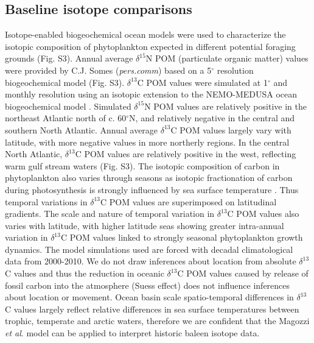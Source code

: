 \documentclass[a4paper,12pt]{article}
\begin{document}
\subsection{Baseline isotope
comparisons}\label{baseline-isotope-comparisons}

Isotope-enabled biogeochemical ocean models \cite{magozzi2017using,schmittner2016complementary} were used to characterize
the isotopic composition of phytoplankton expected in different
potential foraging grounds (Fig. S3). 
Annual average \(\delta^{15}\)N POM (particulate organic matter) values were provided by C.J. Somes (\textit{pers.comm}) based on a 5\({}^{\circ}\) resolution biogeochemical model (Fig. S3). \(\delta^{13}\)C POM values were simulated at 1\({}^{\circ}\) and monthly resolution using an isotopic extension to the NEMO-MEDUSA ocean biogeochemical model \cite{magozzi2017using,yool2013medusa}. 
Simulated \(\delta^{15}\)N POM values are relatively positive in the northeast Atlantic north of c. 60\({}^{\circ}\)N, and relatively negative in the central and southern North Atlantic. 
Annual average \(\delta^{13}\)C POM values largely vary with latitude, with more negative values in more northerly regions. 
In the central North Atlantic, \(\delta^{13}\)C POM values are relatively positive in the west, reflecting warm gulf stream waters (Fig. S3). 
The isotopic composition of carbon in phytoplankton also varies through seasons as isotopic fractionation of carbon during photosynthesis is strongly influenced by sea surface temperature \cite{magozzi2017using,laws1995dependence}. 
Thus temporal variations in \(\delta^{13}\)C POM values are superimposed on latitudinal gradients. 
The scale and nature of temporal variation in \(\delta^{13}\)C POM values also varies with latitude, with higher latitude seas showing greater intra-annual variation in \(\delta^{13}\)C POM values linked to strongly seasonal phytoplankton growth dynamics.
The model simulations used are forced with decadal climatological data from 2000-2010\cite{magozzi2017using}. 
We do not draw inferences about location from absolute \(\delta^{13}\)C values and thus the reduction in oceanic \(\delta^{13}\)C POM values caused by release of fossil carbon into the atmosphere (Suess effect) does not influence inferences about location or movement. 
Ocean basin scale spatio-temporal differences in \(\delta^{13}\)C values largely reflect relative differences in sea surface temperatures between trophic, temperate and arctic waters, therefore we are confident that the Magozzi \textit{et al}.\cite{magozzi2017using} model can be applied to interpret historic baleen isotope data.
\end{document}
